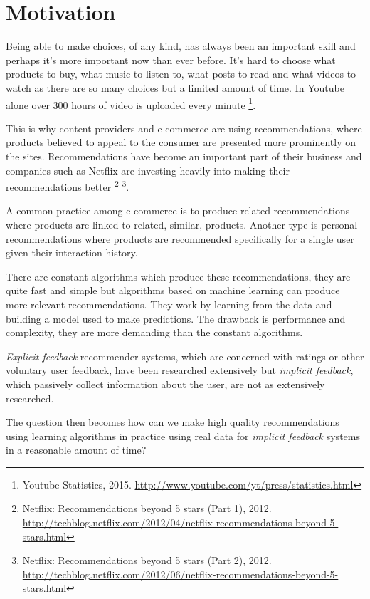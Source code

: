 
\section{Motivation}\label{sec:intro:motivation}

Being able to make choices, of any kind, has always been an important skill and perhaps it's more important now than ever before. It's hard to choose what products to buy, what music to listen to, what posts to read and what videos to watch as there are so many choices but a limited amount of time. In Youtube alone over 300 hours of video is uploaded every minute
\footnote{Youtube Statistics, 2015. \url{http://www.youtube.com/yt/press/statistics.html}}.

This is why content providers and e-commerce are using recommendations, where products believed to appeal to the consumer are presented more prominently on the sites. Recommendations have become an important part of their business and companies such as Netflix are investing heavily into making their recommendations better
\footnote{ Netflix: Recommendations beyond 5 stars (Part 1), 2012. \url{http://techblog.netflix.com/2012/04/netflix-recommendations-beyond-5-stars.html} }
\footnote{ Netflix: Recommendations beyond 5 stars (Part 2), 2012. \url{http://techblog.netflix.com/2012/06/netflix-recommendations-beyond-5-stars.html} }.

A common practice among e-commerce is to produce related recommendations where products are linked to related, similar, products. Another type is personal recommendations where products are recommended specifically for a single user given their interaction history.

There are constant algorithms which produce these recommendations, they are quite fast and simple but algorithms based on machine learning can produce more relevant recommendations. They work by learning from the data and building a model used to make predictions. The drawback is performance and complexity, they are more demanding than the constant algorithms.

\textit{Explicit feedback} recommender systems, which are concerned with ratings or other voluntary user feedback, have been researched extensively but \textit{implicit feedback}, which passively collect information about the user, are not as extensively researched. \citep{hu2008collaborative, bobadilla2013recommender}

The question then becomes how can we make high quality recommendations using learning algorithms in practice using real data for \textit{implicit feedback} systems in a reasonable amount of time?

